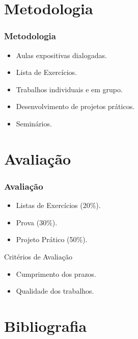 \documentclass[
	10pt, %
	t, %
]{beamer}
\begin{document}
\section{Metodologia}

\begin{frame}
	\frametitle{Metodologia}

	\begin{itemize}
		\item Aulas expositivas dialogadas.
		\item Lista de Exercícios.
		\item Trabalhos individuais e em grupo.
		\item Desenvolvimento de projetos práticos.
		\item Seminários.
	\end{itemize}
	
\end{frame}

\section{Avaliação}

\begin{frame}
	\frametitle{Avaliação}

	\begin{itemize}
		\item Listas de Exercícios (20\%).
		\item Prova (30\%).
		\item Projeto Prático (50\%).
	\end{itemize}

	\begin{block}{Critérios de Avaliação}
		\begin{itemize}
			\item Cumprimento dos prazos.
			\item Qualidade dos trabalhos.
		\end{itemize}
	\end{block}

\end{frame}

\section{Bibliografia}
\end{document}
